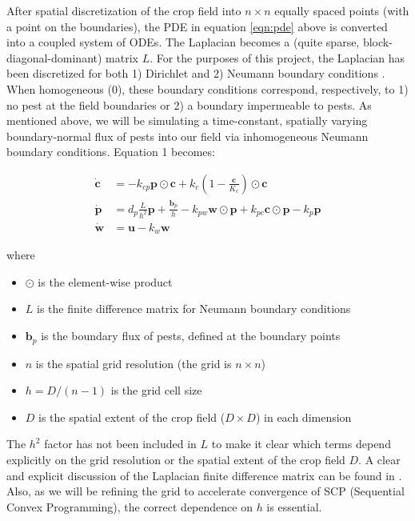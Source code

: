 \documentclass[11pt]{article}
\begin{document}
After spatial discretization of the crop field into $n \times n$ equally spaced points (with a point on the boundaries), the PDE in equation \ref{eqn:pde} above is converted into a coupled system of ODEs. The Laplacian becomes a (quite sparse, block-diagonal-dominant) matrix $L$. For the purposes of this project, the Laplacian has been discretized for both 1) Dirichlet and 2) Neumann boundary conditions \cite{R5}. When homogeneous (0), these boundary conditions correspond, respectively, to 1) no pest at the field boundaries or 2) a boundary impermeable to pests. As mentioned above, we will be simulating a time-constant, spatially varying boundary-normal flux of pests into our field via inhomogeneous Neumann boundary conditions. Equation 1 becomes:

\begin{align}
\dot{\bm{c}} &= -k_{cp} \bm{p} \odot \bm{c} + k_c \left( 1 - \frac{\bm{c}}{K_c} \right) \odot \bm{c} \nonumber \\ 
\dot{\bm{p}} &= d_p \frac{L}{h^2} \bm{p} + \frac{\bm{b}_p}{h} - k_{pw} \bm{w} \odot \bm{p} + k_{pc} \bm{c} \odot \bm{p} - k_p \bm{p} \\
\dot{\bm{w}} &= \bm{u} - k_w \bm{w} \nonumber
\end{align}

where

\begin{itemize}
\setlength\itemsep{-1pt}
\item $\odot$ is the element-wise product
\item $L$ is the finite difference matrix for Neumann boundary conditions
\item $\bm{b}_p$ is the boundary flux of pests, defined at the boundary points
\item $n$ is the spatial grid resolution (the grid is $n \times n$)
\item $h = D / (n-1)$ is the grid cell size
\item $D$ is the spatial extent of the crop field ($D \times D$) in each dimension
\end{itemize}

The $h^2$ factor has not been included in $L$ to make it clear which terms depend explicitly on the grid resolution or the spatial extent of the crop field $D$. A clear and explicit discussion of the Laplacian finite difference matrix can be found in \cite{R5}. Also, as we will be refining the grid to accelerate convergence of SCP (Sequential Convex Programming), the correct dependence on $h$ is essential.
\end{document}
